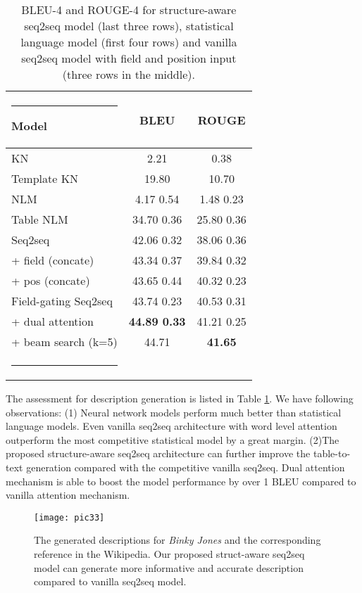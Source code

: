 \documentclass[letterpaper]{article} \usepackage{aaai18}  \usepackage{times}  \usepackage{helvet}  \usepackage{courier}  \usepackage{url}  \usepackage{graphicx}  \frenchspacing  \setlength{\pdfpagewidth}{8.5in}  \setlength{\pdfpageheight}{11in}  \usepackage{amsmath}
\makeatletter
\def\hlinewd#1{\noalign{\ifnum0=`}\fi\hrule \@height #1 \futurelet
   \reserved@a\@xhline}
\makeatother
\begin{document}
\begin{table}[t]
	\begin{center}
		\begin{tabular}{lcc}		
		\hlinewd{1pt} \textbf{Model} & \textbf{BLEU} & \textbf{ROUGE} \\ \hline
		KN & 2.21 & 0.38 \\ 
		Template KN & 19.80 & 10.70 \\
		NLM & 4.17  0.54 & 1.48  0.23 \\ 
		Table NLM & 34.70  0.36 & 25.80  0.36  \\ \hline
		Seq2seq   & 42.06  0.32 & 38.06  0.36 \\
		+ field (concate) & 43.34  0.37 & 39.84  0.32\\
		+ pos (concate) & 43.65  0.44 & 40.32  0.23 \\ \hline
		Field-gating Seq2seq & 43.74  0.23 & 40.53  0.31 \\
		+ dual attention & \textbf{44.89  0.33} & 41.21  0.25 \\
		+ beam search (k=5) & 44.71& \textbf{41.65} \\
			\hlinewd{1pt} \\
		\end{tabular}
		\caption{BLEU-4 and ROUGE-4 for structure-aware seq2seq model (last three rows), statistical language model (first four rows) and vanilla seq2seq model with field and position input (three rows in the middle).}
		\label{res}
	\end{center}
\end{table}

The assessment for description generation is listed in Table \ref{res}. We have following observations:
(1) Neural network models perform much better than statistical language models. Even vanilla seq2seq architecture with word level attention outperform the most competitive statistical model by a great margin.
(2)The proposed structure-aware seq2seq architecture can further improve the table-to-text generation compared with the competitive vanilla seq2seq. Dual attention mechanism is able to boost the model performance by over 1 BLEU compared to vanilla attention mechanism.

\begin{figure*}[t]
\centering
\texttt{[image: pic33]}
\caption{The generated descriptions  for \textit{Binky Jones} and the corresponding reference in the Wikipedia. Our proposed struct-aware seq2seq model can generate more informative and accurate description compared to vanilla seq2seq model.}\label{case-study}
\end{figure*}
\end{document}
